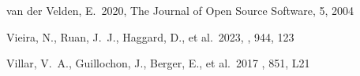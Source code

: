 \documentclass[twocolumn, twocolappendix]{aastex63}
\begin{document}
\begin{thebibliography}{}












 van der Velden, E.\ 2020, The Journal of Open Source Software, 5, 2004




 Vieira, N., Ruan, J.~J., Haggard, D., et al.\ 2023, \apj, 944, 123

Villar, V.~A., Guillochon, J., Berger, E., et al.\ 2017 \aj, 851, L21











\end{thebibliography}
\end{document}
